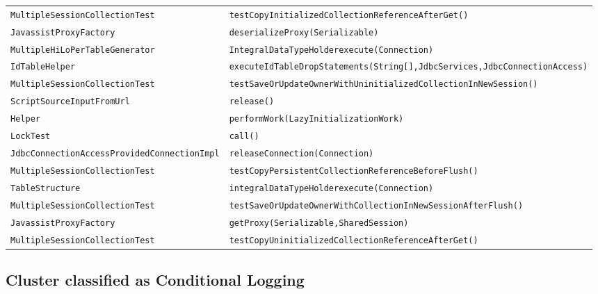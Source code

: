 \begin{center}
\begin{longtable}{ll}
\lstinline/MultipleSessionCollectionTest/&{\lstinline/testCopyInitializedCollectionReferenceAfterGet()/}\\
\lstinline/JavassistProxyFactory/&{\lstinline/deserializeProxy(Serializable)/}\\
\lstinline/MultipleHiLoPerTableGenerator/&{\lstinline/IntegralDataTypeHolderexecute(Connection)/}\\
\lstinline/IdTableHelper/&{\lstinline/executeIdTableDropStatements(String[],JdbcServices,JdbcConnectionAccess)/}\\
\lstinline/MultipleSessionCollectionTest/&{\lstinline/testSaveOrUpdateOwnerWithUninitializedCollectionInNewSession()/}\\
\lstinline/ScriptSourceInputFromUrl/&{\lstinline/release()/}\\
\lstinline/Helper/&{\lstinline/performWork(LazyInitializationWork)/}\\
\lstinline/LockTest/&{\lstinline/call()/}\\
\lstinline/JdbcConnectionAccessProvidedConnectionImpl/&{\lstinline/releaseConnection(Connection)/}\\
\lstinline/MultipleSessionCollectionTest/&{\lstinline/testCopyPersistentCollectionReferenceBeforeFlush()/}\\
\lstinline/TableStructure/&{\lstinline/integralDataTypeHolderexecute(Connection)/}\\
\lstinline/MultipleSessionCollectionTest/&{\lstinline/testSaveOrUpdateOwnerWithCollectionInNewSessionAfterFlush()/}\\
\lstinline/JavassistProxyFactory/&{\lstinline/getProxy(Serializable,SharedSession)/}\\
\lstinline/MultipleSessionCollectionTest/&{\lstinline/testCopyUninitializedCollectionReferenceAfterGet()/}\\

\end{longtable}
\end{center}

\subsection{Cluster classified as Conditional Logging}

